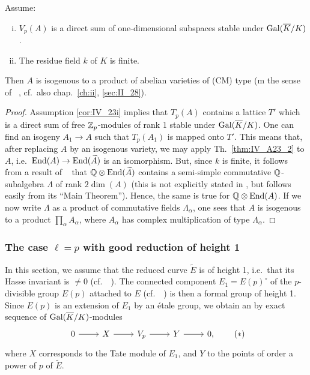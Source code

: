 \begin{subappendices}
\begin{cor}\label{cor:IV_A23_2}
	Assume:
	\begin{enumerate}[(i)]
		\item\label{cor:IV_23i}
			$V_p(A)$ is a direct sum of one-dimensional subspaces
			stable under $\operatorname{Gal}(\overline{K}/K)$.
		\item\label{cor:IV_23ii}
			The residue field $k$ of $K$ is finite.
	\end{enumerate}
	Then $A$ is isogenous to a product of abelian varieties of (CM) type (m
	the sense of \citeauthor{34}~\cite{34}, cf.\ also chap.~\ref{ch:ii},
	\ref{sec:II_28}).
\end{cor}
\begin{proof}
	Assumption \ref{cor:IV_23i} implies that $T_p(A)$ contains a lattice
	$T'$ which is a direct sum of free $\mathbb{Z}_p$-modules of rank 1 stable
	under $\operatorname{Gal}(\overline{K}/K)$. One can find an isogeny $A_1 \to A$ such that
	$T_p(A_1)$ is mapped onto $T'$. This means that, after replacing $A$ by
	an isogenous variety, we may apply Th.~\ref{thm:IV_A23_2} to $A$, i.e.\
	$\operatorname{End}(A) \to \operatorname{End}(\widetilde A)$ is an isomorphism. But, since $k$ is
	finite, it follows from a result of \citeauthor{38}~\cite{38} that $\mathbb{Q}
	\otimes \operatorname{End}(\widetilde A)$ contains a semi-simple commutative\break
	$\mathbb{Q}$-subalgebra $\Lambda$ of rank $2 \dim(A)$ (this is not explicitly
	stated in \cite{38}, but follows easily from its ``Main Theorem'').
	Hence, the same is true for $\mathbb{Q} \otimes \operatorname{End}(A)$. If we now write
	$\Lambda$ as a product of commutative fields $\Lambda_\alpha$, one sees
	that $A$ is isogenous to a product $\prod_{\alpha} A_\alpha$, where
	$A_\alpha$ has complex multiplication of type $\Lambda_\alpha$.
\end{proof}

\subsubsection{The case \texorpdfstring{$\ell = p$}{ℓ = p} with good reduction
of height 1}
\label{sec:IV_A24}
In this section, we assume that the reduced curve $\widetilde{E}$ is of
height 1, i.e.\ that its Hasse invariant is $\ne 0$ (cf.\
\citeauthor{9}~\cite{9}). The connected component $E_1 = E(p)^\circ$ of the
$p$-divisible group $E(p)$
\dpage
attached to $E$ (cf.\ \citeauthor{39}~\cite{39}) is then a formal group of
height 1.
Since $E(p)$ is an extension of $E_1$ by an étale group, we obtain an by exact
sequence of $\operatorname{Gal}(\overline{K}/K)$-modules
\begin{equation}
	\begin{tikzcd}
		0 \rar & X \rar & V_p \rar & Y \rar & 0,
	\end{tikzcd}
	\tag{$*$}
	\label{eqn:IV_A24}
\end{equation}
where $X$ corresponds to the Tate module of $E_1$, and $Y$ to the
points of order a power of $p$ of $\widetilde{E}$.
\todo[bluetask]{Update notation?}%


\end{subappendices}
